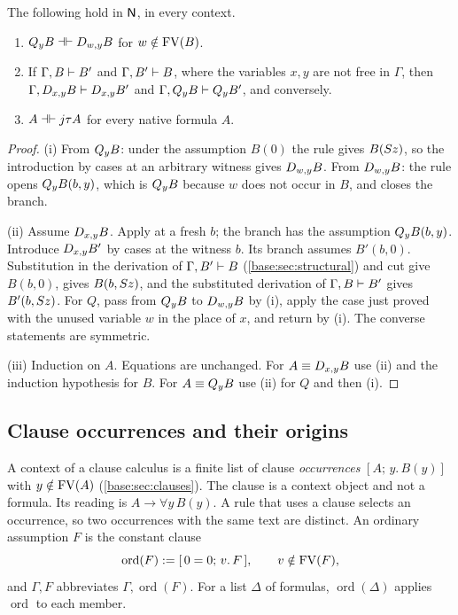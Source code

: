 \begin{lemma}
\label{claus:lem:unq}
The following hold in $\mathsf{N}$, in every context.
\begin{enumerate}[label=(\roman*)]
\item $Q_{y}B\dashv\vdash D_{w,y}B$ for $w\notin\operatorname{FV}(B)$.
\item If $\Gamma,B\vdash B'$ and $\Gamma,B'\vdash B$, where the variables
$x,y$ are not free in $\Gamma$, then
$\Gamma,D_{x,y}B\vdash D_{x,y}B'$ and $\Gamma,Q_{y}B\vdash Q_{y}B'$, and
conversely.
\item $A\dashv\vdash j\tau A$ for every native formula $A$.
\end{enumerate}
\end{lemma}
\begin{proof}
(i) From $Q_{y}B$: under the assumption $B(0)$ the rule  gives $B(S z)$,
so the introduction by cases at an arbitrary witness gives $D_{w,y}B$.
From $D_{w,y}B$: the rule  opens $Q_{y}B(b,y)$, which is $Q_{y}B$ because
$w$ does not occur in $B$, and  closes the branch.

(ii) Assume $D_{x,y}B$. Apply  at a fresh $b$; the branch has the
assumption $Q_{y}B(b,y)$. Introduce $D_{x,y}B'$ by cases at the witness $b$.
Its branch assumes $B'(b,0)$. Substitution in the derivation of
$\Gamma,B'\vdash B$ (\cref{base:sec:structural}) and cut give $B(b,0)$, 
gives $B(b,S z)$, and the substituted derivation of $\Gamma,B\vdash B'$
gives $B'(b,S z)$. For $Q$, pass from $Q_{y}B$ to $D_{w,y}B$ by (i),
apply the case just proved with the unused variable $w$ in the place of
$x$, and return by (i). The converse statements are symmetric.

(iii) Induction on $A$. Equations are unchanged. For $A\equiv D_{x,y}B$ use
(ii) and the induction hypothesis for $B$. For $A\equiv Q_{y}B$ use (ii) for
$Q$ and then (i).
\end{proof}

\subsection{Clause occurrences and their origins}
\label{claus:sec:origins}

A context of a clause calculus is a finite list of clause
\emph{occurrences} $[A;\,y.\,B(y)]$ with $y\notin\operatorname{FV}(A)$
(\cref{base:sec:clauses}). The clause is a context object and not a formula.
Its reading is $A\to\forall y\,B(y)$. A rule that uses a clause selects an
occurrence, so two occurrences with the same text are distinct. An ordinary
assumption $F$ is the constant clause
\[
 \operatorname{ord}(F)\mathrel{:=}[\,0=0;\,v.\,F\,],\qquad v\notin\operatorname{FV}(F),
\]
and $\Gamma,F$ abbreviates $\Gamma,\operatorname{ord}(F)$. For a list
$\Delta$ of formulas, $\operatorname{ord}(\Delta)$ applies
$\operatorname{ord}$ to each member.

